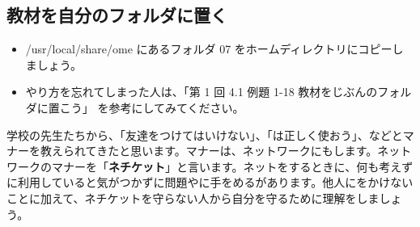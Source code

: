 \documentclass[a4paper,12pt,dvipdfmx]{jarticle}
\newcounter {PagePtr}
\begin{document}
\subsection*{教材を自分のフォルダに置く}
\begin{itemize}
	\item /usr/local/share/ome にあるフォルダ 07 をホームディレクトリにコピーしましょう。
	\item やり方を忘れてしまった人は、「第 1 回 4.1 例題 1-18 教材をじぶんのフォルダに置こう」 を参考にしてみてください。

\end{itemize}

\label{P:Netiquette}
学校の先生たちから、「友達をつけてはいけない」、「は正しく使おう」、などとマナーを教えられてきたと思います。マナーは、ネットワークにもします。ネットワークのマナーを「\textbf{ネチケット}」と言います。ネットをするときに、何も考えずに利用していると気がつかずに問題やに手をめるがあります。他人にをかけないことに加えて、ネチケットを守らない人から自分を守るために理解をしましょう。
\end{document}

